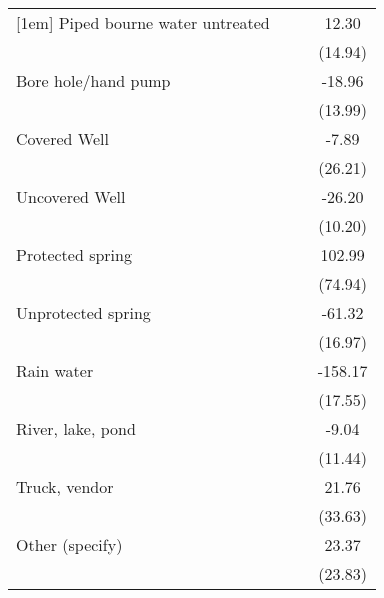 {\begin{tabular}{l*{3}{c}}
[1em]
Piped bourne water untreated&                     &                     &       12.30         \\
                    &                     &                     &     (14.94)         \\
[1em]
Bore hole/hand pump &                     &                     &      -18.96         \\
                    &                     &                     &     (13.99)         \\
[1em]
Covered Well        &                     &                     &       -7.89         \\
                    &                     &                     &     (26.21)         \\
[1em]
Uncovered Well      &                     &                     &      -26.20\sym{*}  \\
                    &                     &                     &     (10.20)         \\
[1em]
Protected spring    &                     &                     &      102.99         \\
                    &                     &                     &     (74.94)         \\
[1em]
Unprotected spring  &                     &                     &      -61.32\sym{***}\\
                    &                     &                     &     (16.97)         \\
[1em]
Rain water          &                     &                     &     -158.17\sym{***}\\
                    &                     &                     &     (17.55)         \\
[1em]
River, lake, pond   &                     &                     &       -9.04         \\
                    &                     &                     &     (11.44)         \\
[1em]
Truck, vendor       &                     &                     &       21.76         \\
                    &                     &                     &     (33.63)         \\
[1em]
Other (specify)     &                     &                     &       23.37         \\
                    &                     &                     &     (23.83)         \\

\end{tabular}}
